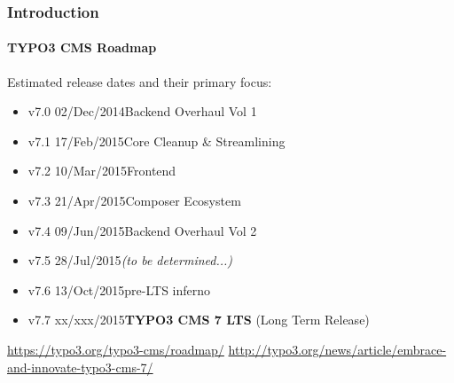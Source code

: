 
\begin{frame}[fragile]
	\frametitle{Introduction}
	\framesubtitle{TYPO3 CMS Roadmap}

	Estimated release dates and their primary focus:

	\begin{itemize}
		\item v7.0 \textrightarrow\tabto{1.3cm}02/Dec/2014\tabto{3.4cm}Backend Overhaul Vol 1

		\item
			\begingroup
				\color{typo3orange}
					v7.1 \textrightarrow\tabto{1.3cm}17/Feb/2015\tabto{3.4cm}Core Cleanup \& Streamlining
			\endgroup

		\item v7.2 \textrightarrow\tabto{1.3cm}10/Mar/2015\tabto{3.4cm}Frontend
		\item v7.3 \textrightarrow\tabto{1.3cm}21/Apr/2015\tabto{3.4cm}Composer Ecosystem
		\item v7.4 \textrightarrow\tabto{1.3cm}09/Jun/2015\tabto{3.4cm}Backend Overhaul Vol 2
		\item v7.5 \textrightarrow\tabto{1.3cm}28/Jul/2015\tabto{3.4cm}\textit{(to be determined...)}
		\item v7.6 \textrightarrow\tabto{1.3cm}13/Oct/2015\tabto{3.4cm}pre-LTS inferno
		\item v7.7 \textrightarrow\tabto{1.3cm}xx/xxx/2015\tabto{3.4cm}\textbf{TYPO3 CMS 7 LTS} (Long Term Release)
	\end{itemize}

	\smaller
		\url{https://typo3.org/typo3-cms/roadmap/}\newline
		\url{http://typo3.org/news/article/embrace-and-innovate-typo3-cms-7/}
	\normalsize

\end{frame}


